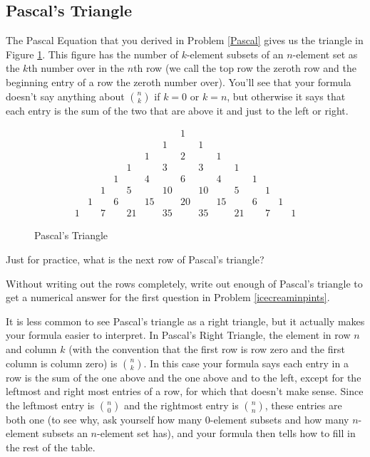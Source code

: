 \ep

\subsection{Pascal's Triangle}

The Pascal Equation that you derived in Problem \ref{Pascal}
gives us the triangle in Figure \ref{Pascaltriangle}.  This
figure has the number of $k$-element subsets of an $n$-element
set as the $k$th number over in the
$n$th row (we call the top row the zeroth row and the
beginning entry of a row the zeroth number over).  You'll see
that your formula doesn't say anything about
$n\choose k$ if
$k=0$ or
$k=n$, but otherwise it says that each entry is the sum of
the two that are above it and just to the left or right.  

\begin{figure}[h]\caption{Pascal's
Triangle}\label{Pascaltriangle}
$$\begin{matrix}
&&&&&&&1&&&&&&&\\
&&&&&&1&&1&&&&&&\\
&&&&&1&&2&&1&&&&&\\
&&&&1&&3&&3&&1&&&&\\
&&&1&&4&&6&&4&&1&&\\
&&1&&5&&10&&10&&5&&1&\\
&1&&6&&15&&20&&15&&6&&1\\
1&&7&&21&&35&&35&&21&&7&&1
\end{matrix}$$
\end{figure}


\bp
\item Just for practice, what is the next row of Pascal's triangle?

\itemi Without writing out the rows completely, write out enough of Pascal's
triangle to get a numerical answer for the first question  in Problem
\ref{icecreaminpints}.
\ep

It is less common to see Pascal's triangle as a right
triangle, but it actually makes your formula easier to
interpret.  In Pascal's Right Triangle, the element in row $n$
and column $k$ (with the convention that the first row is row
zero and the first column is column zero) is $n\choose k$.  In
this case your formula says each entry in a row is the sum of
the one above and the one above and to the left, except for
the leftmost and right most entries of a row, for which that
doesn't make sense.  Since the leftmost entry is $n\choose 0$
and the rightmost entry is
$n\choose n$, these entries are both one (to see why, ask yourself how
many $0$-element subsets and how many $n$-element subsets an
$n$-element set has), and
your formula then tells how to fill in the rest of the table.


